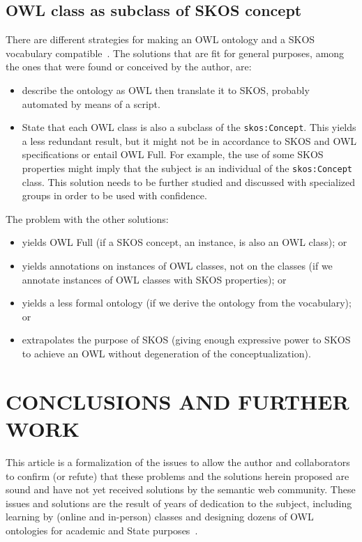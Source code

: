 \documentclass[12pt,fleqn]{article}
\begin{document}
\subsection{OWL class as subclass of SKOS concept}\label{owlSkos}
There are different
strategies for making an OWL ontology and a SKOS vocabulary compatible~\citep{owlSkos}.
The solutions that are fit for general purposes, among the ones that were found or conceived by the author, are:
\begin{itemize}
	\item describe the ontology as OWL then translate it to SKOS, probably automated by means of a script.
	\item State that each OWL class is also a subclass of the \texttt{skos:Concept}.
		This yields a less redundant result, but it might not be in accordance to SKOS and OWL specifications
		or entail OWL Full.
		For example, the use of some SKOS properties might imply that the subject is an individual of the \texttt{skos:Concept} class.
		This solution needs to be further studied and discussed with specialized groups in order to be used with confidence.
\end{itemize}

The problem with the other solutions:
\begin{itemize}
	\item yields OWL Full (if a SKOS concept, an instance, is also an OWL class); or
	\item yields annotations on instances of OWL classes, not on the classes
		(if we annotate instances of OWL classes with SKOS properties); or
	\item yields a less formal ontology (if we derive the ontology from the vocabulary); or
	\item extrapolates the purpose of SKOS
		(giving enough expressive power to SKOS to achieve an OWL without degeneration of the conceptualization).
\end{itemize}

\section{CONCLUSIONS AND FURTHER WORK}\label{sec:con}
This article is a formalization of the issues to allow
the author and collaborators to confirm (or refute) that these problems
and the solutions herein proposed are sound and have not yet received
solutions by the semantic web community.
These issues and solutions are the result of years of dedication
to the subject, including learning by (online and in-person) classes
and designing dozens of OWL ontologies for academic and State purposes~\citep{pnud5}.
\end{document}
